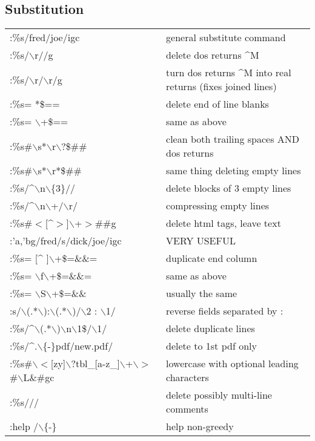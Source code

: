 \documentclass[10pt]{article}
\begin{document}
\subsection*{Substitution}
\begin{center}
\begin{longtable}{l|l}
 :\%s/fred/joe/igc & general substitute command\\ 
 :\%s/$\backslash$r//g & delete dos returns \^{}M\\ 
 :\%s/$\backslash$r/$\backslash$r/g & turn dos returns \^{}M into real returns (fixes joined lines) \\ 
 :\%s= *\$== & delete end of line blanks\\ 
 :\%s= $\backslash$+\$== & same as above\\ 
 :\%s\#$\backslash$s*$\backslash$r$\backslash$?\$\#\# & clean both trailing spaces AND dos returns\\ 
 :\%s\#$\backslash$s*$\backslash$r*\$\#\# & same thing deleting empty lines\\ 
 :\%s/\^{}$\backslash$n$\backslash$\{3\}// & delete blocks of 3 empty lines\\ 
 :\%s/\^{}$\backslash$n$\backslash$+/$\backslash$r/ & compressing empty lines\\ 
 :\%s\#$<$[\^{}$>$]$\backslash$+$>$\#\#g & delete html tags, leave text\\ 
 :'a,'bg/fred/s/dick/joe/igc & VERY USEFUL\\ 
 :\%s= [\^{} ]$\backslash$+\$=\&\&= & duplicate end column\\ 
 :\%s= $\backslash$f$\backslash$+\$=\&\&= & same as above\\ 
 :\%s= $\backslash$S$\backslash$+\$=\&\& & usually the same\\ 
 :s/$\backslash$(.*$\backslash$):$\backslash$(.*$\backslash$)/$\backslash$2 : $\backslash$1/ & reverse fields separated by :\\ 
 :\%s/\^{}$\backslash$(.*$\backslash$)$\backslash$n$\backslash$1\$/$\backslash$1/ & delete duplicate lines\\ 
 :\%s/\^{}.$\backslash$\{-\}pdf/new.pdf/ & delete to 1st pdf only\\ 
 :\%s\#$\backslash$$<$[zy]$\backslash$?tbl\_[a-z\_]$\backslash$+$\backslash$$>$\#$\backslash$L\&\#gc & lowercase with optional leading characters\\ 
 :\%s/// & delete possibly multi-line comments\\ 
 :help /$\backslash$\{-\} & help non-greedy\\ 

\end{longtable}
\end{center}
\end{document}

